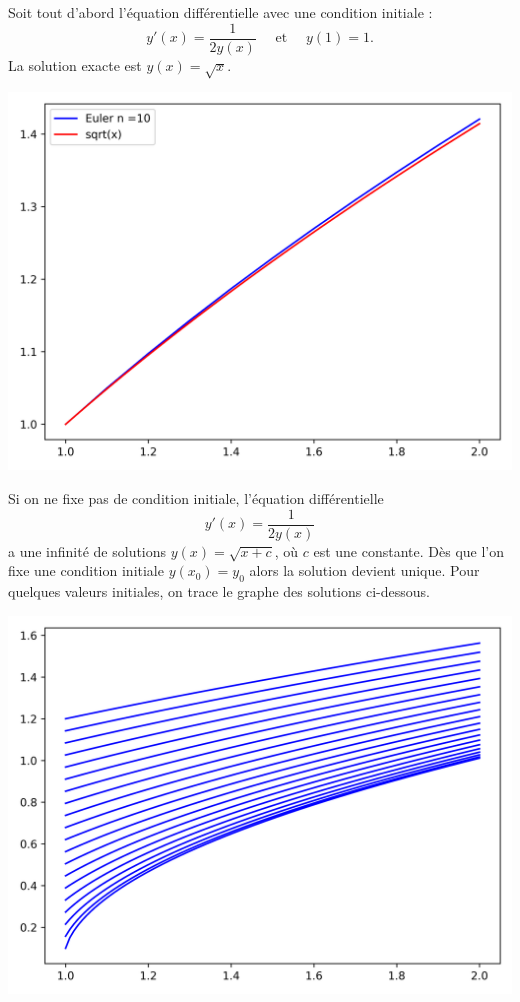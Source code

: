 \documentclass[11pt,class=report,crop=false]{standalone}
\begin{document}
\begin{exemple}
Soit tout d'abord l'équation différentielle avec une condition initiale :
$$y'(x) = \frac{1}{2y(x)} \quad \text{ et } \quad y(1) = 1.$$
La solution exacte est $y(x) = \sqrt{x}$.
\begin{center}
  \includegraphics[scale=\myscale,scale=0.6]{figures/equadiff-euler-01}
\end{center}

Si on ne fixe pas de condition initiale, l'équation différentielle 
$$y'(x) = \frac{1}{2y(x)}$$
a une infinité de solutions $y(x) = \sqrt{x+c}$, où $c$ est une constante.
Dès que l'on fixe une condition initiale $y(x_0) = y_0$ alors la solution devient unique.
Pour quelques valeurs initiales, on trace le graphe des solutions ci-dessous.
\begin{center}
    \includegraphics[scale=\myscale,scale=0.6]{figures/equadiff-euler-02}
  \end{center}
\end{exemple}
\end{document}
